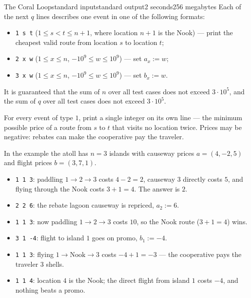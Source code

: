 \begin{problem}{The Coral Loop}{standard input}{standard output}{2 seconds}{256 megabytes}
Each of the next $q$ lines describes one event in one of the following formats:
\begin{itemize}
\item \texttt{1 s t} ($1 \le s < t \le n+1$, where location $n+1$ is the Nook) --- print the cheapest valid route from location $s$ to location $t$;
\item \texttt{2 x w} ($1 \le x \le n$, $-10^9 \le w \le 10^9$) --- set $a_x := w$;
\item \texttt{3 x w} ($1 \le x \le n$, $-10^9 \le w \le 10^9$) --- set $b_x := w$.
\end{itemize}

It is guaranteed that the sum of $n$ over all test cases does not exceed $3 \cdot 10^5$, and the sum of $q$ over all test cases does not exceed $3 \cdot 10^5$.


\OutputFile
For every event of type $1$, print a single integer on its own line --- the minimum possible price of a route from $s$ to $t$ that visits no location twice. Prices may be negative: rebates can make the cooperative pay the traveler.


\Example

\begin{example}
%
\end{example}

\Note
In the example the atoll has $n = 3$ islands with causeway prices $a = (4, -2, 5)$ and flight prices $b = (3, 7, 1)$.

\begin{itemize}
\item \texttt{1 1 3}: paddling $1 \to 2 \to 3$ costs $4 - 2 = 2$, causeway $3$ directly costs $5$, and flying through the Nook costs $3 + 1 = 4$. The answer is $2$.
\item \texttt{2 2 6}: the rebate lagoon causeway is repriced, $a_2 := 6$.
\item \texttt{1 1 3}: now paddling $1 \to 2 \to 3$ costs $10$, so the Nook route ($3 + 1 = 4$) wins.
\item \texttt{3 1 -4}: flight to island $1$ goes on promo, $b_1 := -4$.
\item \texttt{1 1 3}: flying $1 \to \text{Nook} \to 3$ costs $-4 + 1 = -3$ --- the cooperative pays the traveler $3$ shells.
\item \texttt{1 1 4}: location $4$ is the Nook; the direct flight from island $1$ costs $-4$, and nothing beats a promo.
\end{itemize}


\end{problem}

